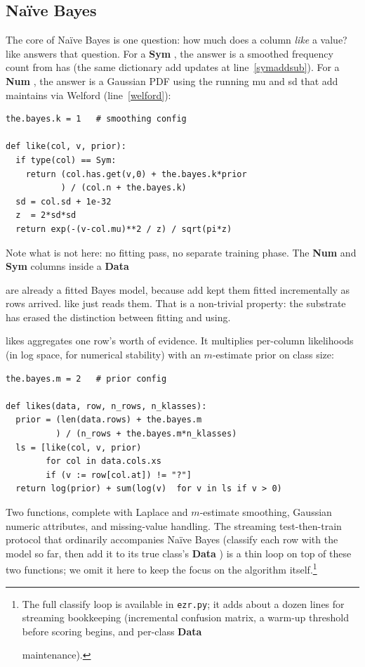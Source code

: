 \documentclass[AMA,STIX2COL]{WileyNJDv5}
\newcommand{\cls}[1]{%
  \setlength{\fboxsep}{1.5pt}%
  \colorbox{clsbg}{\sffamily\bfseries{#1}}%
}
\begin{document}
\subsection{Naïve Bayes}

The core of Naïve Bayes is one question: how much does a column
{\em like} a value? \textsf{like} answers that question. For a
\cls{Sym}, the answer is a smoothed frequency count from
\textsf{has} (the same dictionary \textsf{add} updates at
line~\ref{symaddsub}). For a \cls{Num}, the answer is a Gaussian
PDF using the running \textsf{mu} and \textsf{sd} that
\textsf{add} maintains via Welford (line~\ref{welford}):

\begin{verbatim}
the.bayes.k = 1   # smoothing config

def like(col, v, prior):
  if type(col) == Sym:
    return (col.has.get(v,0) + the.bayes.k*prior
           ) / (col.n + the.bayes.k)
  sd = col.sd + 1e-32
  z  = 2*sd*sd
  return exp(-(v-col.mu)**2 / z) / sqrt(pi*z)
\end{verbatim}
Note what is not here: no fitting pass, no separate training
phase. The \cls{Num} and \cls{Sym} columns inside a \cls{Data}
are already a fitted Bayes model, because \textsf{add} kept them
fitted incrementally as rows arrived. \textsf{like} just reads
them. That is a non-trivial property: the substrate has erased
the distinction between fitting and using.

\textsf{likes} aggregates one row's worth of evidence. It
multiplies per-column likelihoods (in log space, for numerical
stability) with an $m$-estimate prior on class size:

\begin{verbatim}
the.bayes.m = 2   # prior config

def likes(data, row, n_rows, n_klasses):
  prior = (len(data.rows) + the.bayes.m
          ) / (n_rows + the.bayes.m*n_klasses)
  ls = [like(col, v, prior)
        for col in data.cols.xs
        if (v := row[col.at]) != "?"]
  return log(prior) + sum(log(v)  for v in ls if v > 0)
\end{verbatim}
Two functions, complete with Laplace and $m$-estimate smoothing,
Gaussian numeric attributes, and missing-value handling. The
streaming test-then-train protocol that ordinarily accompanies
Naïve Bayes (classify each row with the model so far, then add
it to its true class's \cls{Data}) is a thin loop on top of
these two functions; we omit it here to keep the focus on the
algorithm itself.\footnote{The full \textsf{classify} loop is
available in \texttt{ezr.py}; it adds about a dozen lines for
streaming bookkeeping (incremental confusion matrix, a warm-up
threshold before scoring begins, and per-class \cls{Data}
maintenance).}
\end{document}
